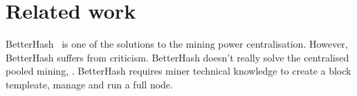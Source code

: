 \section{Related work}





BetterHash~\cite{draft-bip-BetterHash} is one of the solutions to the mining power centralisation.
However, BetterHash suffers from criticism.
BetterHash doesn't really solve the centralised pooled mining, .
BetterHash requires miner technical knowledge to create a block templeate, manage and run a full node.